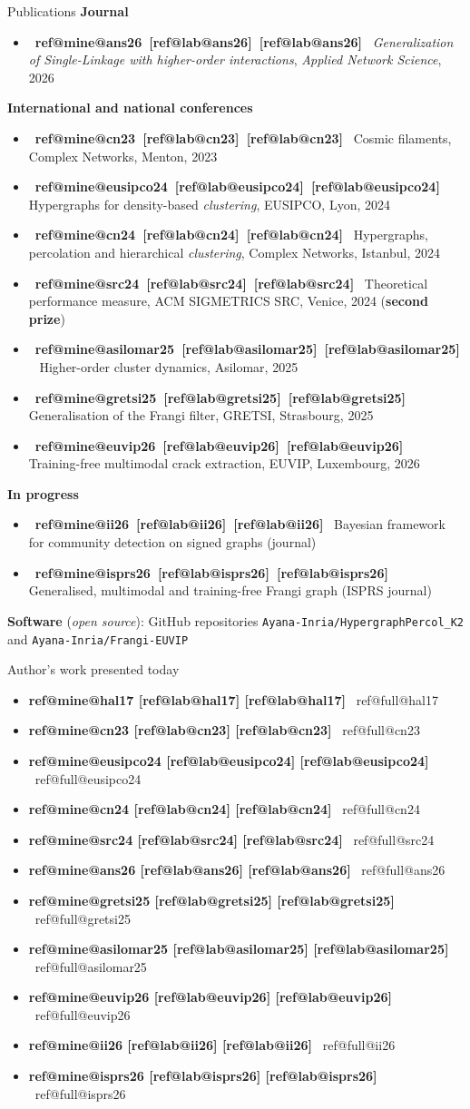 \documentclass[A4,svgnames,9pt,aspectratio=169]{beamer}
\makeatletter
\newcommand{\refbracket}[1]{%
  \ifcsname ref@mine@#1\endcsname
    \textcolor{inria-rouge}{[\csname ref@lab@#1\endcsname]}%
  \else
    \textcolor{gris_fonce_inria}{[\csname ref@lab@#1\endcsname]}%
  \fi}
\newcommand{\citb}[1]{\mbox{{\footnotesize\bfseries\refbracket{#1}}}}
\newcommand{\bibligne}[1]{\item {\bfseries\refbracket{#1}}\ \csname ref@full@#1\endcsname}
\makeatother
\begin{document}
\begin{frame}{Publications}
    \footnotesize
    \textbf{Journal}
    \begin{itemize}
        \item \citb{ans26} \emph{Generalization of Single-Linkage with higher-order interactions}, \textit{Applied Network Science}, 2026
    \end{itemize}
    \textbf{International and national conferences}
    \begin{itemize}
        \item \citb{cn23} Cosmic filaments, Complex Networks, Menton, 2023
        \item \citb{eusipco24} Hypergraphs for density-based \emph{clustering}, EUSIPCO, Lyon, 2024
        \item \citb{cn24} Hypergraphs, percolation and hierarchical \emph{clustering}, Complex Networks, Istanbul, 2024
        \item \citb{src24} Theoretical performance measure, ACM SIGMETRICS SRC, Venice, 2024 (\textbf{second prize})
        \item \citb{asilomar25} Higher-order cluster dynamics, Asilomar, 2025
        \item \citb{gretsi25} Generalisation of the Frangi filter, GRETSI, Strasbourg, 2025
        \item \citb{euvip26} Training-free multimodal crack extraction, EUVIP, Luxembourg, 2026
    \end{itemize}
    \textbf{In progress}
    \begin{itemize}
        \item \citb{ii26} Bayesian framework for community detection on signed graphs (journal)
        \item \citb{isprs26} Generalised, multimodal and training-free Frangi graph (ISPRS journal)
    \end{itemize}
    \textbf{Software} (\emph{open source}): GitHub repositories \texttt{Ayana-Inria/HypergraphPercol\_K2}
    and \texttt{Ayana-Inria/Frangi-EUVIP}
\end{frame}

\frame{\merci}

\begin{frame}{Author's work presented today}
    \scriptsize
    \begin{itemize}
        \setlength{\itemsep}{3pt}
        \bibligne{hal17}
        \bibligne{cn23}
        \bibligne{eusipco24}
        \bibligne{cn24}
        \bibligne{src24}
        \bibligne{ans26}
        \bibligne{gretsi25}
        \bibligne{asilomar25}
        \bibligne{euvip26}
        \bibligne{ii26}
        \bibligne{isprs26}
    \end{itemize}
\end{frame}
\end{document}
